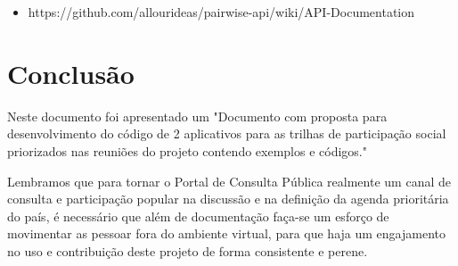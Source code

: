\documentclass[12pt]{article}
\newcommand{\ProductDescription}{"Documento com proposta para desenvolvimento
  do código de 2 aplicativos para as trilhas de participação social
  priorizados nas reuniões do projeto contendo exemplos e códigos."
}
\begin{document}
\begin{itemize}
  \item https://github.com/allourideas/pairwise-api/wiki/API-Documentation
\end{itemize}

\section{Conclusão}

Neste documento foi apresentado um \ProductDescription

Lembramos que para tornar o Portal de Consulta Pública realmente um canal de
consulta e participação popular na discussão e na definição da agenda
prioritária do país, é necessário que além de documentação faça-se um esforço
de movimentar as pessoar fora do ambiente virtual, para que haja um
engajamento no uso e contribuição deste projeto de forma consistente e perene.

\newpage

\newpage
\listoffigures
\newpage
\printindex
\newpage


%
\end{document}

